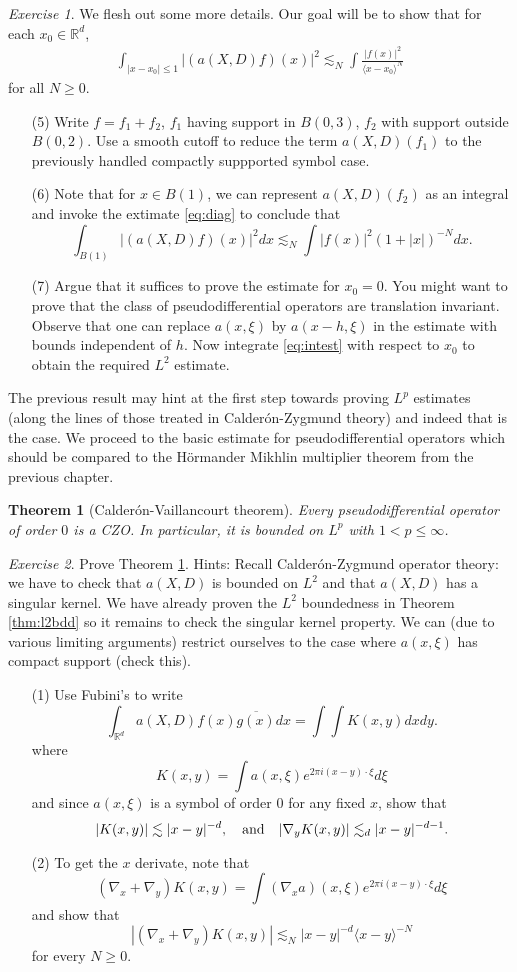 \documentclass[11pt]{article}
\newtheorem{thm}{Theorem}
\theoremstyle{remark}
\newtheorem{exr}{Exercise}
\newcommand{\1}{\textbf{1}}
\newcommand{\lle}{\lesssim}
\def\brac#1{\langle #1  \rangle}
\newcommand{\bbR}{\mathbb{R}}
\begin{document}
\begin{exr}
We flesh out some more details. Our goal will be to show that for each $x_0 \in \bbR^d$, 
\begin{align}
\int_{|x-x_0| \leq 1} |(a(X,D) f)(x)|^2 \lle_N \int \frac{|f(x)|^2}{\brac{x-x_0}^N}
\label{eq:intest}
\end{align}
for all $N \geq 0$.
\begin{enumerate}
\item[(5)] Write $f= f_1 + f_2$, $f_1$ having support in $B(0,3)$, $f_2$ with support outside $B(0,2)$. Use a smooth cutoff to reduce the term $a(X,D)(f_1)$ to the previously handled compactly suppported symbol case.
\item[(6)] Note that for $x \in B(1)$, we can represent $a(X,D)(f_2)$ as an integral and invoke the extimate \eqref{eq:diag} to conclude that
\[
\int_{B(1)} |(a(X,D) f)(x)|^2 dx \lle_N \int |f(x)|^2 (1 + |x|)^{-N} dx.
\]
\item[(7)] Argue that it suffices to prove the estimate for $x_0 = 0$. You might want to prove that the class of pseudodifferential operators are translation invariant. Observe that one can replace $a(x,\xi)$ by $a(x-h,\xi)$ in the estimate with bounds independent of $h$. Now integrate \eqref{eq:intest} with respect to $x_0$ to obtain the required $L^2$ estimate.
\end{enumerate}
\end{exr}
The previous result may hint at the first step towards proving $L^p$ estimates (along the lines of those treated in Calder\'on-Zygmund theory) and indeed that is the case. We proceed to the basic estimate for pseudodifferential operators which should be compared to the H\"ormander Mikhlin multiplier theorem from the previous chapter.
\begin{thm}[Calder\'on-Vaillancourt theorem]
Every pseudodifferential operator of order $0$ is a CZO. In particular, it is bounded on $L^p$ with $1 < p \leq \infty$.
\label{thm:cv}
\end{thm}
\begin{exr}
Prove Theorem \ref{thm:cv}. Hints: Recall Calder\'on-Zygmund operator theory: we have to check that $a(X,D)$ is bounded on $L^2$ and that $a(X,D)$ has a singular kernel. We have already proven the $L^2$ boundedness in Theorem \ref{thm:l2bdd} so it remains to check the singular kernel property. We can (due to various limiting arguments) restrict ourselves to the case where $a(x,\xi)$ has compact support (check this).
\begin{enumerate}
\item[(1)] Use Fubini's to write
\[
\int_{\bbR^d} a(X,D) f(x) \overline{g(x)} dx = \int \int K(x,y) dx dy.
\]
where
\[
K(x,y) = \int a(x,\xi) e^{2 \pi i (x-y) \cdot \xi} d\xi
\]
and since $a(x,\xi)$ is a symbol of order $0$ for any fixed $x$, show that
\[
|K(x,y)| \lle |x-y|^{-d}, \quad \textup{and} \quad |\nabla_y K(x,y)| \lle_d |x-y|^{-d -1}.
\]
\item[(2)] To get the $x$ derivate, note that
\[
(\nabla_x + \nabla_y) K(x,y) = \int (\nabla_x a)(x,\xi)  e^{2 \pi i (x-y) \cdot \xi}  d\xi
\]
and show that
\[
|(\nabla_x + \nabla_y) K(x,y)| \lle_N |x-y|^{-d} \brac{x-y}^{-N}
\]
for every $N \geq 0$.
\end{enumerate}
\end{exr}
\end{document}
